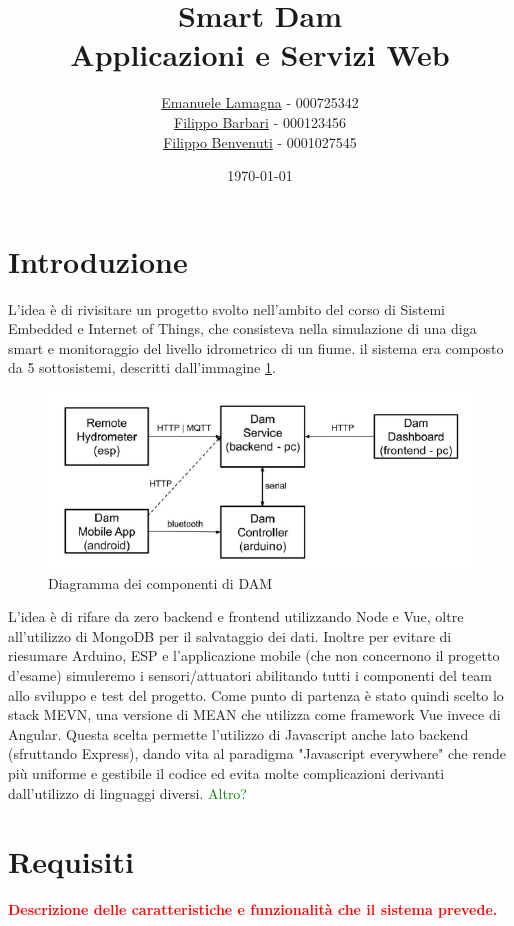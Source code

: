 \documentclass{article}
\title{
    Smart Dam \\
    \large Applicazioni e Servizi Web
}
\author{\href{mailto:emalama@studio.unibo.it}{Emanuele Lamagna} - 000725342\\\href{mailto:filippo.barbari@studio.unibo.it}{Filippo Barbari} - 000123456\\\href{mailto:filippo.benvenuti3@studio.unibo.it}{Filippo Benvenuti} - 0001027545}
\date{\today}
\begin{document}
\maketitle
\section*{Introduzione}\label{sec:intro}
L'idea è di rivisitare un progetto svolto nell'ambito del corso di Sistemi Embedded e Internet of Things, che consisteva nella simulazione di una diga smart e monitoraggio del livello idrometrico di un fiume. il sistema era composto da 5 sottosistemi, descritti dall'immagine \ref{fig:dam-scheme}.
\begin{figure}[h!]
	\centering
	\includegraphics[scale=0.7]{dam-scheme.png}
	\caption{Diagramma dei componenti di DAM}
	\label{fig:dam-scheme}
\end{figure}
L'idea è di rifare da zero backend e frontend utilizzando Node e Vue, oltre all'utilizzo di MongoDB per il salvataggio dei dati. Inoltre per evitare di riesumare Arduino, ESP e l'applicazione mobile (che non concernono il progetto d'esame) simuleremo i sensori/attuatori abilitando tutti i componenti del team allo sviluppo e test del progetto.
Come punto di partenza è stato quindi scelto lo stack MEVN, una versione di MEAN che utilizza come framework Vue invece di Angular. Questa scelta permette l'utilizzo di Javascript anche lato backend (sfruttando Express), dando vita al paradigma "Javascript everywhere" che rende più uniforme e gestibile il codice ed evita molte complicazioni derivanti dall'utilizzo di linguaggi diversi. 
\textcolor{green}{Altro?}

\section{Requisiti}
\textcolor{red}{\textbf{Descrizione delle caratteristiche e funzionalità che il sistema prevede.}} %
\end{document}
